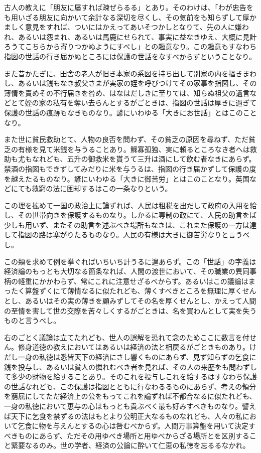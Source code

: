 \documentclass[a4paper, platex, dvipdfmx]{jsarticle}
\begin{document}
古人の教えに「朋友に屡すれば疎ぜらるる」とあり。そのわけは、「わが忠告をも用いざる朋友に向かいて余計なる深切を尽くし、その気前をも知らずして厚かましく意見をすれば、ついにはかえってあいそつかしとなりて、先の人に嫌われ、あるいは怨まれ、あるいは馬鹿にせられて、事実に益なきゆえ、大概に見計ろうてこちらから寄りつかぬようにすべし」との趣意なり。この趣意もすなわち指図の世話の行き届かぬところには保護の世話をなすべからずということなり。

また昔かたぎに、田舎の老人が旧き本家の系図を持ち出して別家の内を掻きまわし、あるいは銭もなき叔父さまが実家の姪を呼びつけてその家事を指図し、その薄情を責めその不行届きを咎め、はなはだしきに至りては、知らぬ祖父の遺言などとて姪の家の私有を奪い去らんとするがごときは、指図の世話は厚きに過ぎて保護の世話の痕跡もなきものなり。諺にいわゆる「大きにお世話」とはこのことなり。

また世に貧民救助とて、人物の良否を問わず、その貧乏の原因を尋ねず、ただ貧乏の有様を見て米銭を与うることあり。鰥寡孤独、実に頼るところなき者へは救助も尤もなれども、五升の御救米を貰うて三升は酒にして飲む者なきにあらず。禁酒の指図もできずしてみだりに米を与うるは、指図の行き届かずして保護の度を越えたるものなり。諺にいわゆる「大きに御苦労」とはこのことなり。英国などにても救窮の法に困却するはこの一条なりという。

この理を拡めて一国の政治上に論ずれば、人民は租税を出だして政府の入用を給し、その世帯向きを保護するものなり。しかるに専制の政にて、人民の助言をば少しも用いず、またその助言を述ぶべき場所もなきは、これまた保護の一方は達して指図の路は塞がりたるものなり。人民の有様は大きに御苦労なりと言うべし。

この類を求めて例を挙ぐればいちいち計うるに遑あらず。この「世話」の字義は経済論のもっとも大切なる箇条なれば、人間の渡世において、その職業の異同事柄の軽重にかかわらず、常にこれに注意せざるべからず。あるいはこの議論はまったく算盤ずくにて薄情なるに似たれども、薄くすべきところを無理に厚くせんとし、あるいはその実の薄きを顧みずしてその名を厚くせんとし、かえって人間の至情を害して世の交際を苦々しくするがごときは、名を買わんとして実を失うものと言うべし。

右のごとく議論は立てたれども、世人の誤解を恐れて念のためここに数言を付せん。修身道徳の教えにおいてはあるいは経済の法と相戻るがごときものあり。けだし一身の私徳は悉皆天下の経済にさし響くものにあらず、見ず知らずの乞食に銭を投与し、あるいは貧人の憐れむべき者を見れば、その人の来歴をも問わずして多少の財物を給することあり。そのこれを投与しこれを給するはすなわち保護の世話なれども、この保護は指図とともに行なわるるものにあらず、考えの領分を窮屈にしてただ経済上の公をもってこれを論ずれば不都合なるに似たれども、一身の私徳において恵与の心はもっとも貴ぶべく最も好みすべきものなり。譬えば天下に乞食を禁ずるの法はもとより公明正大なるものなれども、人々の私において乞食に物を与えんとするの心は咎むべからず。人間万事算盤を用いて決定すべきものにあらず、ただその用ゆべき場所と用ゆべからざる場所とを区別すること緊要なるのみ。世の学者、経済の公論に酔いて仁恵の私徳を忘るるなかれ。
\end{document}

